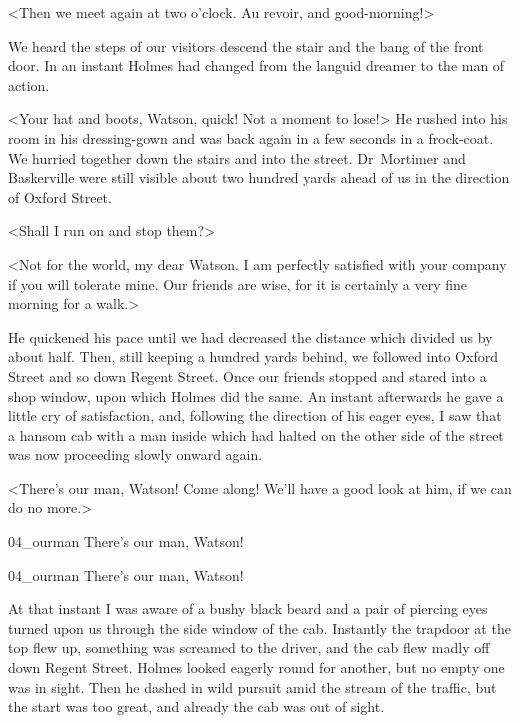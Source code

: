 <Then we meet again at two o'clock. Au revoir, and good-morning!>

We heard the steps of our visitors descend the stair and the bang of the front door. In an instant Holmes had changed from the languid dreamer to the man of action.

<Your hat and boots, Watson, quick! Not a moment to lose!> He rushed into his room in his dressing-gown and was back again in a few seconds in a frock-coat. We hurried together down the stairs and into the street. Dr~Mortimer and Baskerville were still visible about two hundred yards ahead of us in the direction of Oxford Street.

<Shall I run on and stop them?>

<Not for the world, my dear Watson. I am perfectly satisfied with your company if you will tolerate mine. Our friends are wise, for it is certainly a very fine morning for a walk.>

He quickened his pace until we had decreased the distance which divided us by about half. Then, still keeping a hundred yards behind, we followed into Oxford Street and so down Regent Street. Once our friends stopped and stared into a shop window, upon which Holmes did the same. An instant afterwards he gave a little cry of satisfaction, and, following the direction of his eager eyes, I saw that a hansom cab with a man inside which had halted on the other side of the street was now proceeding slowly onward again.

<There's our man, Watson! Come along! We'll have a good look at him, if we can do no more.>

\begin{letter}
	\begin{bwbigpic}
			[1.0]  
		{04_ourman}
		{There's our man, Watson!}
	\end{bwbigpic}
\end{letter}
\begin{a4}
	\begin{bwbigpic}
			[1.0]  
		{04_ourman}
		{There's our man, Watson!}
	\end{bwbigpic}
\end{a4}


At that instant I was aware of a bushy black beard and a pair of piercing eyes turned upon us through the side window of the cab. Instantly the trapdoor at the top flew up, something was screamed to the driver, and the cab flew madly off down Regent Street. Holmes looked eagerly round for another, but no empty one was in sight. Then he dashed in wild pursuit amid the stream of the traffic, but the start was too great, and already the cab was out of sight.

